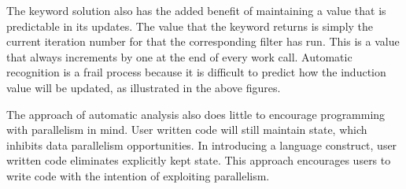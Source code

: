 The keyword solution also has the added benefit of maintaining a value that is predictable in its updates.  The value that the keyword returns is simply the current iteration number for that the corresponding filter has run.  This is a value that always increments by one at the end of every work call.  Automatic recognition is a frail process because it is difficult to predict how the induction value will be updated, as illustrated in the above figures.  

The approach of automatic analysis also does little to encourage programming with parallelism in mind.  User written code will still maintain state, which inhibits data parallelism opportunities.  In introducing a language construct, user written code eliminates explicitly kept state.  This approach encourages users to write code with the intention of exploiting parallelism.


